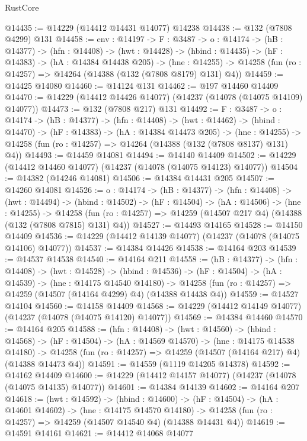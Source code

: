 \begin{lexlean}{RustCore}
\begin{coremodule}
@14435 := @14229 (@14412 @14431 @14077) @14238
@14438 := @132 (@7808 @4299) @131
@14458 := {env : @14197} ->
  {F : @3487} ->
  {o : @14174} ->
  (hB : @14377) ->
  (hfn : @14408) ->
  (hwt : @14428) ->
  (hbind : @14435) ->
  (hF : @14383) ->
  (hA : @14384 @14438 @205) ->
  (hne : @14255) -> @14258 (fun (ro : @14257) => @14264 (@14388 (@132 (@7808 @8179) @131) @4))
@14459 := @14425 @14080
@14460 := @14124 @131
@14462 := @197 @14460 @14409
@14470 := @14229 (@14412 @14426 @14077) (@14237 (@14078 (@14075 @14109) @14077))
@14473 := @132 (@7808 @217) @131
@14492 := {F : @3487} ->
  {o : @14174} ->
  (hB : @14377) ->
  (hfn : @14408) ->
  (hwt : @14462) ->
  (hbind : @14470) ->
  (hF : @14383) ->
  (hA : @14384 @14473 @205) ->
  (hne : @14255) -> @14258 (fun (ro : @14257) => @14264 (@14388 (@132 (@7808 @8137) @131) @4))
@14493 := @14459 @14081
@14494 := @14140 @14409
@14502 := @14229 (@14412 @14460 @14077) (@14237 (@14078 (@14075 @14123) @14077))
@14504 := @14382 (@14246 @14081)
@14506 := @14384 @14431 @205
@14507 := @14260 @14081
@14526 := {o : @14174} ->
  (hB : @14377) ->
  (hfn : @14408) ->
  (hwt : @14494) ->
  (hbind : @14502) ->
  (hF : @14504) ->
  (hA : @14506) ->
  (hne : @14255) ->
  @14258 (fun (ro : @14257) => @14259 (@14507 @217 @4) (@14388 (@132 (@7808 @7815) @131) @4))
@14527 := @14493 @14165
@14528 := @14150 @14409
@14536 := @14229 (@14412 @14139 @14077) (@14237 (@14078 (@14075 @14106) @14077))
@14537 := @14384 @14426
@14538 := @14164 @203
@14539 := @14537 @14538
@14540 := @14164 @211
@14558 := (hB : @14377) ->
  (hfn : @14408) ->
  (hwt : @14528) ->
  (hbind : @14536) ->
  (hF : @14504) ->
  (hA : @14539) ->
  (hne : @14175 @14540 @14180) ->
  @14258 (fun (ro : @14257) => @14259 (@14507 (@14164 @4299) @4) (@14388 @14438 @4))
@14559 := @14527 @14104
@14560 := @14158 @14409
@14568 := @14229 (@14412 @14149 @14077) (@14237 (@14078 (@14075 @14120) @14077))
@14569 := @14384 @14460
@14570 := @14164 @205
@14588 := (hfn : @14408) ->
  (hwt : @14560) ->
  (hbind : @14568) ->
  (hF : @14504) ->
  (hA : @14569 @14570) ->
  (hne : @14175 @14538 @14180) ->
  @14258 (fun (ro : @14257) => @14259 (@14507 (@14164 @217) @4) (@14388 @14473 @4))
@14591 := @14559 (@1119 @14205 @14378)
@14592 := @14162 @14409
@14600 := @14229 (@14412 @14157 @14077) (@14237 (@14078 (@14075 @14135) @14077))
@14601 := @14384 @14139
@14602 := @14164 @207
@14618 := (hwt : @14592) ->
  (hbind : @14600) ->
  (hF : @14504) ->
  (hA : @14601 @14602) ->
  (hne : @14175 @14570 @14180) ->
  @14258 (fun (ro : @14257) => @14259 (@14507 @14540 @4) (@14388 @14431 @4))
@14619 := @14591 @14161
@14621 := @14412 @14068 @14077

\end{coremodule}
\end{lexlean}
